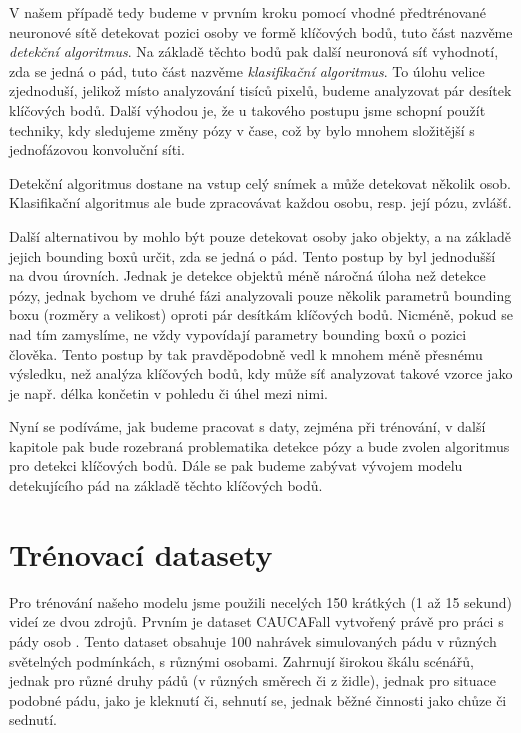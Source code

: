 V našem případě tedy budeme v prvním kroku pomocí vhodné předtrénované
neuronové sítě detekovat pozici osoby ve formě klíčových bodů, tuto část
nazvěme \textit{detekční algoritmus}. Na základě těchto bodů pak další
neuronová síť vyhodnotí, zda se jedná o pád, tuto část nazvěme
\textit{klasifikační algoritmus}. To úlohu velice zjednoduší, jelikož místo
analyzování tisíců pixelů, budeme analyzovat pár desítek klíčových bodů. Další
výhodou je, že u takového postupu jsme schopní použít techniky, kdy sledujeme
změny pózy v čase, což by bylo mnohem složitější s jednofázovou konvoluční
síti.

Detekční algoritmus dostane na vstup celý snímek a může detekovat několik osob.
Klasifikační algoritmus ale bude zpracovávat každou osobu, resp. její pózu,
zvlášť.

Další alternativou by mohlo být pouze detekovat osoby jako objekty, a na
základě jejich bounding boxů určit, zda se jedná o pád. Tento postup by byl
jednodušší na dvou úrovních. Jednak je detekce objektů méně náročná úloha než
detekce pózy, jednak bychom ve druhé fázi analyzovali pouze několik parametrů
bounding boxu (rozměry a velikost) oproti pár desítkám klíčových bodů. Nicméně,
pokud se nad tím zamyslíme, ne vždy vypovídají parametry bounding boxů o pozici
člověka. Tento postup by tak pravděpodobně vedl k mnohem méně přesnému
výsledku, než analýza klíčových bodů, kdy může síť analyzovat takové vzorce
jako je např. délka končetin v pohledu či úhel mezi nimi.

Nyní se podíváme, jak budeme pracovat s daty, zejména při trénování, v další
kapitole pak bude rozebraná problematika detekce pózy a bude zvolen algoritmus
pro detekci klíčových bodů. Dále se pak budeme zabývat vývojem modelu
detekujícího pád na základě těchto klíčových bodů.

\section{Trénovací datasety}
\label{sec:TrainingData}

Pro trénování našeho modelu jsme použili necelých 150 krátkých (1 až 15 sekund)
videí ze dvou zdrojů. Prvním je dataset CAUCAFall vytvořený právě pro práci s
pády osob \cite{caucafall}. Tento dataset obsahuje 100 nahrávek simulovaných
pádu v různých světelných podmínkách, s různými osobami. Zahrnují širokou škálu
scénářů, jednak pro různé druhy pádů (v různých směrech či z židle), jednak pro
situace podobné pádu, jako je kleknutí či, sehnutí se, jednak běžné činnosti
jako chůze či sednutí.

